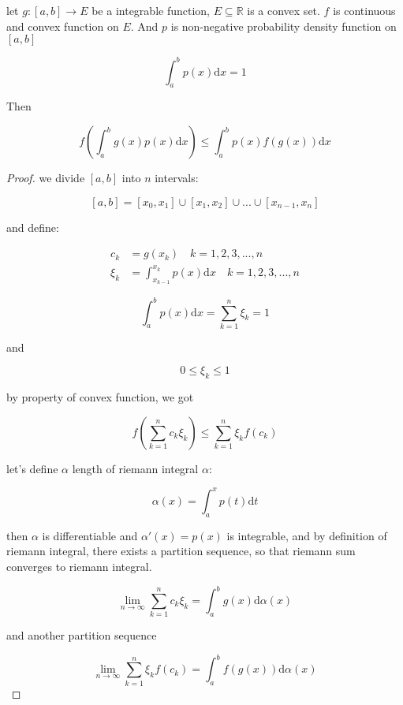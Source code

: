 \documentclass[11pt,a4paper]{article}
\begin{document}
\begin{thm}
    let $g: [a,b] \to E$ be a integrable function, $E \subseteq \mathbb{R}$ is a convex set.
    $f$ is continuous and convex function on $E$. 
    And $p$ is non-negative probability density function on $[a,b]$

    \[
        \int_a^b p(x) \mathrm{d}x = 1
    \]

    Then

    \[
       f\left( \int_a^b g(x) p(x) \mathrm{d} x\right) \le \int_a^b p(x)f(g(x)) \mathrm{d} x
    \]

\end{thm}

\begin{proof}
    we divide $[a,b]$ into $n$ intervals:

    \[
        [a,b] = [x_0,x_1] \cup [x_1,x_2] \cup ... \cup [x_{n-1},x_n]
    \]

    and define:

    \begin{align*}
        c_k &= g(x_k) \quad k = 1,2,3,..., n\\
        \xi_k &= \int_{x_{k-1}}^{x_k} p(x) \mathrm{d}x \quad k = 1,2,3,...,n
    \end{align*}


    \[
        \int_a^b p(x) \mathrm{d}x = \sum_{k=1}^{n} \xi_k = 1
    \]

    and
    
    \[
        0 \le \xi_k \le 1
    \]

    by property of convex function, we got

    \[
        f(\sum_{k=1}^{n} c_{k}\xi_k) \le \sum_{k=1}^{n}\xi_k f(c_k)
    \]

    let's define $\alpha$ length of riemann integral $\alpha:$

    \[
        \alpha(x) = \int_a^{x} p(t) \mathrm{d}t 
    \]

    then $\alpha$ is differentiable and $\alpha'(x) = p(x)$ is integrable, and by definition of riemann integral,
    there exists a partition sequence, so that riemann sum converges to riemann integral.

    \[
        \lim_{n \to \infty}\sum_{k=1}^{n} c_{k}\xi_k = \int_a^b g(x) \mathrm{d} \alpha(x)
    \]


    and another partition sequence 

    \[
        \lim_{n \to \infty}\sum_{k=1}^{n}\xi_k f(c_k) = \int_a^b f(g(x)) \mathrm{d} \alpha(x)
    \]


\end{proof}
\end{document}
